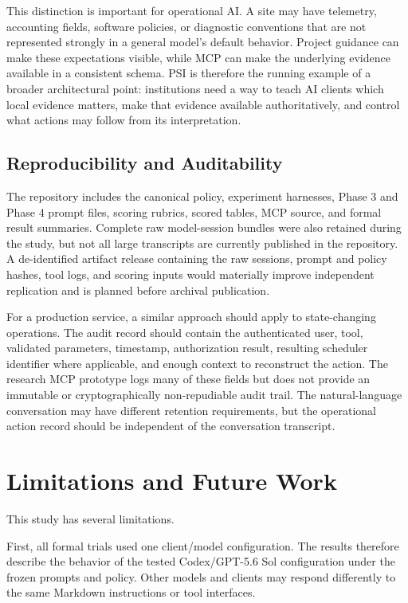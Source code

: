 \documentclass[11pt]{article}
\begin{document}
This distinction is important for operational AI. A site may have telemetry, accounting fields, software policies, or diagnostic conventions that are not represented strongly in a general model's default behavior. Project guidance can make these expectations visible, while MCP can make the underlying evidence available in a consistent schema. PSI is therefore the running example of a broader architectural point: institutions need a way to teach AI clients which local evidence matters, make that evidence available authoritatively, and control what actions may follow from its interpretation.

\subsection{Reproducibility and Auditability}

The repository includes the canonical policy, experiment harnesses, Phase 3 and Phase 4 prompt files, scoring rubrics, scored tables, MCP source, and formal result summaries. Complete raw model-session bundles were also retained during the study, but not all large transcripts are currently published in the repository. A de-identified artifact release containing the raw sessions, prompt and policy hashes, tool logs, and scoring inputs would materially improve independent replication and is planned before archival publication.

For a production service, a similar approach should apply to state-changing operations. The audit record should contain the authenticated user, tool, validated parameters, timestamp, authorization result, resulting scheduler identifier where applicable, and enough context to reconstruct the action. The research MCP prototype logs many of these fields but does not provide an immutable or cryptographically non-repudiable audit trail. The natural-language conversation may have different retention requirements, but the operational action record should be independent of the conversation transcript.

\section{Limitations and Future Work}

This study has several limitations.

First, all formal trials used one client/model configuration. The results therefore describe the behavior of the tested Codex/GPT-5.6 Sol configuration under the frozen prompts and policy. Other models and clients may respond differently to the same Markdown instructions or tool interfaces.
\end{document}
